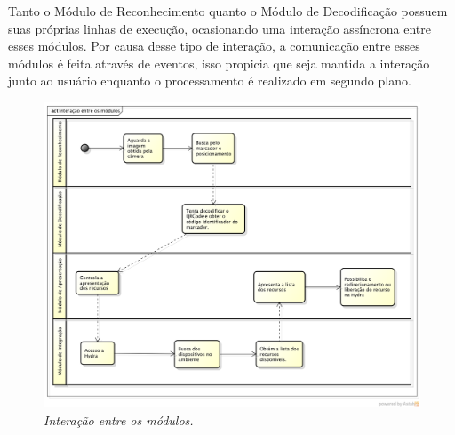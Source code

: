 	Tanto o Módulo de Reconhecimento quanto o Módulo de Decodificação possuem suas próprias linhas de
	execução, ocasionando uma interação assíncrona entre esses módulos. Por causa desse tipo de
	interação, a comunicação entre esses módulos é feita através de eventos, isso propicia que seja
	mantida a interação junto ao usuário enquanto o processamento é realizado em segundo plano.
	
	\begin{figure}[htb]
		\centering \includegraphics[scale=0.45]{figuras/cap4/interacao_modulos.png}
		\caption{\textit{Interação entre os módulos.}}
		\label{fig:interacao_modulos} 
	\end{figure}

	
	
	
	
	
	
		 
	


